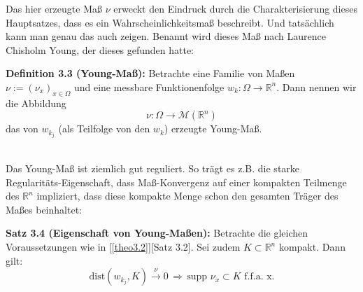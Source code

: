 Das hier erzeugte Maß \(\nu\) erweckt den Eindruck durch die Charakterisierung dieses Hauptsatzes, dass es ein Wahrscheinlichkeitsmaß beschreibt. Und tatsächlich kann man genau das auch zeigen. Benannt wird dieses Maß nach Laurence Chisholm Young, der dieses gefunden hatte:\\
\colorbox{defblue}{\begin{minipage}{16cm}{\textcolor{black}{}{\label{def3.3}}}
\textbf{Definition 3.3 (Young-Maß):} Betrachte eine Familie von Maßen \(\nu := (\nu_x)_{x \in \Omega}\) und eine messbare Funktionenfolge \(w_k:\Omega \to \mathbb{R}^n\). Dann nennen wir die Abbildung
    \begin{equation}
        \nu: \Omega \to \mathcal{M}(\mathbb{R}^n)
    \end{equation}
    das von \(w_{k_j}\) (als Teilfolge von den \(w_k\)) erzeugte Young-Maß.
\end{minipage}}\\

Das Young-Maß ist ziemlich gut reguliert. So trägt es z.B. die starke Regularitäts-Eigenschaft, dass Maß-Konvergenz auf einer kompakten Teilmenge des \(\mathbb{R}^n\) impliziert, dass diese kompakte Menge schon den gesamten Träger des Maßes beinhaltet:\\
\colorbox{theored}{\begin{minipage}{16cm}{\textcolor{black}{}{\label{theo3.4}}}
\textbf{Satz 3.4 (Eigenschaft von Young-Maßen):} Betrachte die gleichen Voraussetzungen wie in [\ref{theo3.2}][Satz 3.2]. Sei zudem \(K \subset \mathbb{R}^n\) kompakt. Dann gilt:
\begin{equation}
    \text{dist}(w_{k_j},K) \stackrel{\nu}{\to} 0 \, \Rightarrow \, \text{supp }\nu_x \subset K\text{ f.f.a. x}.
\end{equation}
\end{minipage}}\\


